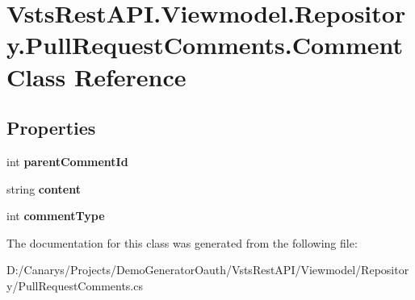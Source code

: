 \hypertarget{class_vsts_rest_a_p_i_1_1_viewmodel_1_1_repository_1_1_pull_request_comments_1_1_comment}{}\section{Vsts\+Rest\+A\+P\+I.\+Viewmodel.\+Repository.\+Pull\+Request\+Comments.\+Comment Class Reference}
\label{class_vsts_rest_a_p_i_1_1_viewmodel_1_1_repository_1_1_pull_request_comments_1_1_comment}
\subsection*{Properties}
\begin{DoxyCompactItemize}
\item 
\mbox{\label{class_vsts_rest_a_p_i_1_1_viewmodel_1_1_repository_1_1_pull_request_comments_1_1_comment_a1ecb8332bff68cf7bfd794dfe8ae5cdf}} 
int {\bfseries parent\+Comment\+Id}
\item 
\mbox{\label{class_vsts_rest_a_p_i_1_1_viewmodel_1_1_repository_1_1_pull_request_comments_1_1_comment_a3e96b8b9bceaceaffe1f6a40a6e8c017}} 
string {\bfseries content}
\item 
\mbox{\label{class_vsts_rest_a_p_i_1_1_viewmodel_1_1_repository_1_1_pull_request_comments_1_1_comment_a09fdacac6c3fe79c70bc89842fd1fe6d}} 
int {\bfseries comment\+Type}
\end{DoxyCompactItemize}


The documentation for this class was generated from the following file\+:\begin{DoxyCompactItemize}
\item 
D\+:/\+Canarys/\+Projects/\+Demo\+Generator\+Oauth/\+Vsts\+Rest\+A\+P\+I/\+Viewmodel/\+Repository/Pull\+Request\+Comments.\+cs\end{DoxyCompactItemize}
